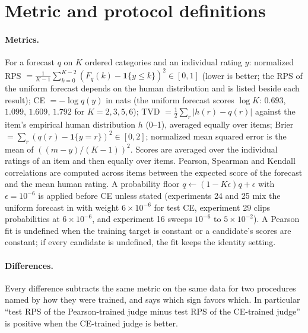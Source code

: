 \section{Metric and protocol definitions}
\label{app:protocols}

\paragraph{Metrics.}
For a forecast $q$ on $K$ ordered categories and an individual rating $y$:
normalized RPS $=\frac1{K-1}\sum_{k=0}^{K-2}(F_q(k)-\mathbf 1\{y\le k\})^2\in[0,1]$ (lower is better; the RPS of the uniform forecast depends on the human distribution and is listed beside each result);
CE $=-\log q(y)$ in nats (the uniform forecast scores $\log K$: $0.693$, $1.099$, $1.609$, $1.792$ for $K=2,3,5,6$);
TVD $=\tfrac12\sum_r|h(r)-q(r)|$ against the item's empirical human distribution $h$ (0--1), averaged equally over items;
Brier $=\sum_r(q(r)-\mathbf 1\{y=r\})^2\in[0,2]$;
normalized mean squared error is the mean of $((m-y)/(K-1))^2$.
Scores are averaged over the individual ratings of an item and then equally over items.
Pearson, Spearman and Kendall correlations are computed across items between the expected score of the forecast and the mean human rating.
A probability floor $q\leftarrow(1-K\epsilon)q+\epsilon$ with $\epsilon=10^{-6}$ is applied before CE unless stated (experiments 24 and 25 mix the uniform forecast in with weight $6\times10^{-6}$ for test CE, experiment 29 clips probabilities at $6\times10^{-6}$, and experiment 16 sweeps $10^{-6}$ to $5\times10^{-2}$).
A Pearson fit is undefined when the training target is constant or a candidate's scores are constant; if every candidate is undefined, the fit keeps the identity setting.

\paragraph{Differences.}
Every difference subtracts the same metric on the same data for two procedures named by how they were trained, and says which sign favors which.
In particular ``test RPS of the Pearson-trained judge minus test RPS of the CE-trained judge'' is positive when the CE-trained judge is better.

